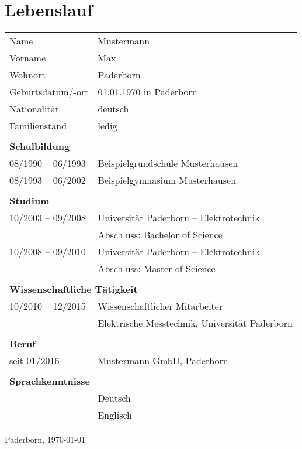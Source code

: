 \chapter{Lebenslauf}

\begin{tabular}{ll}
    Name                & Mustermann\\
    Vorname             & Max\\
    Wohnort             & Paderborn\\
    Geburtsdatum/-ort   & 01.01.1970 in Paderborn\\
    Nationalität        & deutsch\\
    Familienstand       & ledig\\
    \\ \multicolumn{2}{l}{\bfseries Schulbildung}\\
    08/1990 -- 06/1993  & Beispielgrundschule Musterhausen\\
    08/1993 -- 06/2002  & Beispielgymnasium Musterhausen\\
    \\ \multicolumn{2}{l}{\bfseries Studium}\\
    10/2003 -- 09/2008  & Universität Paderborn -- Elektrotechnik\\
                        & Abschluss: Bachelor of Science\\
    10/2008 -- 09/2010  & Universität Paderborn -- Elektrotechnik\\
                        & Abschluss: Master of Science\\
    \\ \multicolumn{2}{l}{\bfseries Wissenschaftliche Tätigkeit}\\
    10/2010 -- 12/2015  & Wissenschaftlicher Mitarbeiter\\
                        & Elektrische Messtechnik, Universität Paderborn\\
    \\ \multicolumn{2}{l}{\bfseries Beruf}\\
    seit 01/2016        & Mustermann GmbH, Paderborn\\
    \\ \multicolumn{2}{l}{\bfseries Sprachkenntnisse}\\
                        & Deutsch\\
                        & Englisch\\
\end{tabular}
\vspace{10mm}

\noindent Paderborn, \today
\vspace{10mm}
